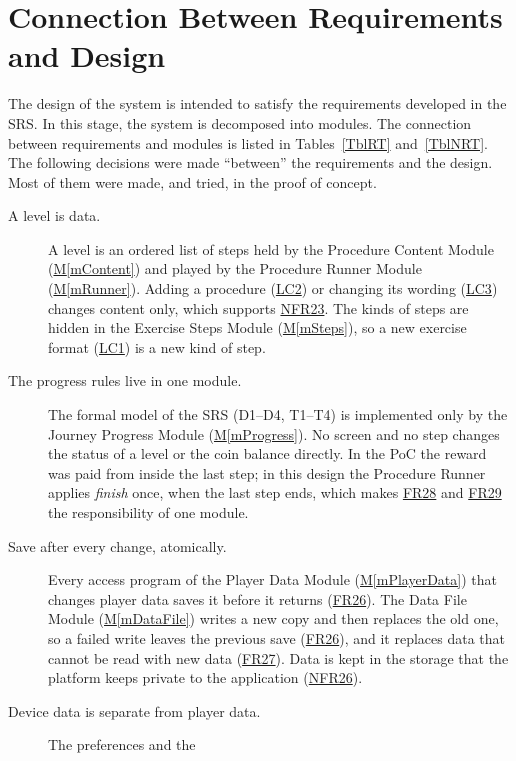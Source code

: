 \documentclass[12pt, titlepage]{article}
\newcommand{\mref}[1]{\hyperref[#1]{M\ref*{#1}}}
\newcommand{\srsurl}{https://team-hindsight.github.io/ophthamology-game/SRS/SRS.pdf}
\newcommand{\srsfrref}[2]{\href{\srsurl\#nameddest=#1}{FR#2}}
\newcommand{\srsnfrref}[2]{\href{\srsurl\#nameddest=#1}{NFR#2}}
\newcommand{\srsitemref}[2]{\href{\srsurl\#nameddest=#1}{#2}}
\begin{document}
\section{Connection Between Requirements and Design} \label{SecConnection}

The design of the system is intended to satisfy the requirements developed in
the SRS. In this stage, the system is decomposed into modules. The connection
between requirements and modules is listed in Tables~\ref{TblRT}
and~\ref{TblNRT}. The following decisions were made ``between'' the
requirements and the design. Most of them were made, and tried, in the proof of
concept.

\begin{description}
\item[A level is data.] A level is an ordered list of steps held by the
  Procedure Content Module (\mref{mContent}) and played by the Procedure Runner
  Module (\mref{mRunner}). Adding a procedure (\srsitemref{LC_Procedures}{LC2})
  or changing its wording (\srsitemref{LC_ClinicalContent}{LC3}) changes content
  only, which supports \srsnfrref{NFR_Maintainability}{23}. The kinds of steps
  are hidden in the Exercise Steps Module (\mref{mSteps}), so a new exercise
  format (\srsitemref{LC_LevelFormat}{LC1}) is a new kind of step.
\item[The progress rules live in one module.] The formal model of the SRS
  (D1--D4, T1--T4) is implemented only by the Journey Progress Module
  (\mref{mProgress}). No screen and no step changes the status of a level or
  the coin balance directly. In the PoC the reward was paid from inside the last
  step; in this design the Procedure Runner applies \emph{finish} once, when the
  last step ends, which makes \srsfrref{FR_FirstReward}{28} and
  \srsfrref{FR_NoDuplicateReward}{29} the responsibility of one module.
\item[Save after every change, atomically.] Every access program of the Player
  Data Module (\mref{mPlayerData}) that changes player data saves it before it
  returns (\srsfrref{FR_PersistState}{26}). The Data File Module
  (\mref{mDataFile}) writes a new copy and then replaces the old one, so a
  failed write leaves the previous save (\srsfrref{FR_PersistState}{26}), and
  it replaces data that cannot be read with new data
  (\srsfrref{FR_CorruptData}{27}). Data is kept in the storage that the
  platform keeps private to the application (\srsnfrref{NFR_DataProtection}{26}).
\item[Device data is separate from player data.] The preferences and the

\end{description}
\end{document}
